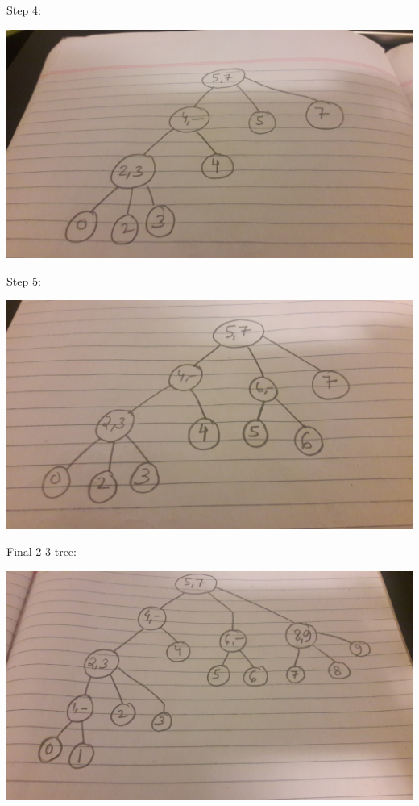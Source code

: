 \documentclass{article}
\begin{document}
Step 4:



\includegraphics[scale=0.1]{22.jpg}




Step 5:




\includegraphics[scale=0.1]{23.jpg}



Final 2-3 tree:



\includegraphics[scale=0.1]{24.jpg}
\end{document}
